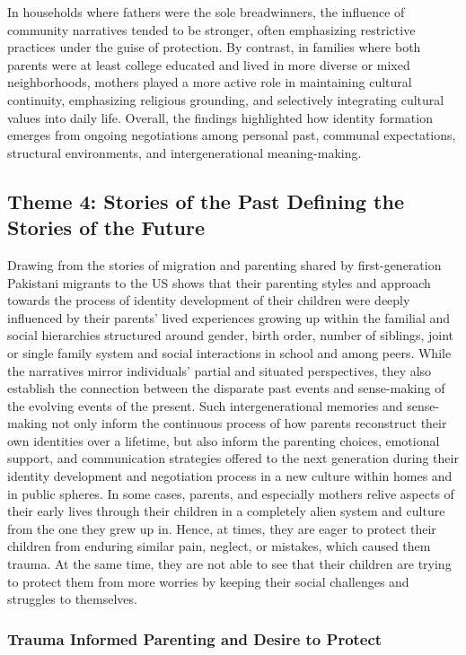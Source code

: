 In households where fathers were the sole breadwinners, the influence of community narratives tended to be stronger, often emphasizing restrictive practices under the guise of protection. By contrast, in families where both parents were at least college educated and lived in more diverse or mixed neighborhoods, mothers played a more active role in maintaining cultural continuity, emphasizing religious grounding, and selectively integrating cultural values into daily life. Overall, the findings highlighted how identity formation emerges from ongoing negotiations among personal past, communal expectations, structural environments, and intergenerational meaning-making.

\subsection{Theme 4: Stories of the Past Defining the Stories of the Future}

Drawing from the stories of migration and parenting shared by first-generation Pakistani migrants to the US shows that their parenting styles and approach towards the process of identity development of their children were deeply influenced by their parents’ lived experiences growing up within the familial and social hierarchies structured around gender, birth order, number of siblings,  joint or single family system and social interactions in school and among peers. While the narratives mirror individuals’ partial and situated perspectives, they also establish the connection between the disparate past events and sense-making of the evolving events of the present. Such intergenerational memories and sense-making not only inform the continuous process of how parents reconstruct their own identities over a lifetime, but also inform the parenting choices, emotional support, and communication strategies offered to the next generation during their identity development and negotiation process in a new culture within homes and in public spheres. In some cases, parents, and especially mothers relive aspects of their early lives through their children in a completely alien system and culture from the one they grew up in. Hence, at times, they are eager to protect their children from enduring similar pain, neglect, or mistakes, which caused them trauma. At the same time, they are not able to see that their children are trying to protect them from more worries by keeping their social challenges and struggles to themselves. 

\subsubsection{Trauma Informed Parenting and Desire to Protect}

